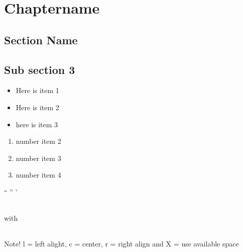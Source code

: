 \chapter{Chaptername}

\section{Section Name}

\section{Sub section 3}


\begin{itemize}
\item Here is item 1
\item Here is item 2
\item here is item 3
\end{itemize}


\begin{enumerate}
\item number item 2
\item number item 3
\item number item 4
\end{enumerate}



“   ” ’




\begin{tabular}{lll}

\end{tabular}

with

\begin{tabularx}{\textwidth}{l X l} %


\end{tabularx}

Note! l = left alight, c = center, r = right align and X = use available space